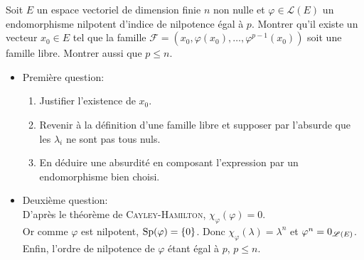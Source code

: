 \begin{exercice}
    Soit $E$ un espace vectoriel de dimension finie $n$ non nulle et $\varphi \in \mathscr{L}(E)$ un endomorphisme nilpotent d'indice de nilpotence égal à $p$. Montrer qu'il existe un vecteur $x_0 \in E$ tel que la famille $\mathscr{F}=(x_0, \varphi(x_0), \dots, \varphi^{p-1}(x_0))$ soit une famille libre. Montrer aussi que $p \leqslant n$. 
\end{exercice}    

\begin{preuve}
    \begin{itemize}
        \item Première question:
        \begin{enumerate}
            \item Justifier l'existence de $x_0$.
            \item Revenir à la définition d'une famille libre et supposer par l'absurde que les $\lambda_i$ ne sont pas tous nuls. 
            \item En déduire une absurdité en composant l'expression par un endomorphisme bien choisi.
        \end{enumerate}
        \item Deuxième question:\\
            D'après le théorème de \textsc{Cayley}-\textsc{Hamilton}, $\chi_{\varphi}(\varphi) = 0$. \\
            Or comme $\varphi$ est nilpotent, $\mathrm{Sp}(\varphi) = \{0\}$. Donc $\chi_{\varphi}(\lambda) = \lambda^n$ et $\varphi^n = 0_{\mathscr{L}(E)}$. Enfin, l'ordre de nilpotence de $\varphi$ étant égal à $p$, $p \leqslant n$.
    \end{itemize}
\end{preuve}
